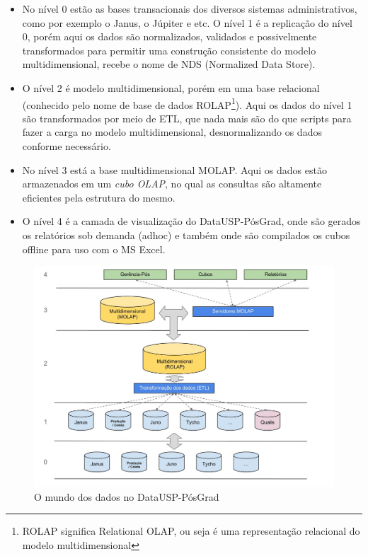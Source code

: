 \begin{itemize}
\item   No nível 0 estão as bases transacionais dos diversos sistemas administrativos, como por exemplo 
o Janus, o Júpiter e etc. O nível 1 é a replicação do nível 0, porém aqui os dados são normalizados, validados e possivelmente transformados para permitir uma construção consistente do modelo multidimensional, recebe o nome de NDS (Normalized Data Store). 

\item  O nível 2 é modelo multidimensional, porém em uma base relacional (conhecido pelo nome de base de dados ROLAP\footnote{ROLAP significa Relational OLAP, ou seja é uma representação relacional do modelo multidimensional}). Aqui os dados do nível 1 são transformados por meio de ETL, que nada mais são do que scripts  para fazer a carga no modelo multidimensional, desnormalizando os dados conforme necessário. \cite{OIJ}

\item  No nível 3 está a base multidimensional MOLAP. Aqui os dados estão armazenados em um \emph{cubo OLAP}, no qual as consultas são altamente eficientes pela estrutura do mesmo.   

\item  O nível 4 é a camada de visualização do DataUSP-PósGrad, onde são gerados os relatórios sob demanda (adhoc) e também onde são compilados os cubos offline para uso com o MS Excel.
\end{itemize}

\begin{figure}[H]\centering
  \centerline{\includegraphics[width=\textwidth]{figuras/arquitetura.jpg}}
  \caption{O mundo dos dados no DataUSP-PósGrad}\label{fig:arq}
\end{figure}

